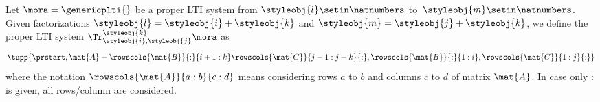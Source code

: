 %

\begin{definition}\label{def:trace-lti-prop}
    Let $\mora = \genericplti{}$ be a proper LTI system from $\styleobj{l}\setin \natnumbers$ to~$\styleobj{m}\setin \natnumbers$.
    Given factorizations $\styleobj{l} = \styleobj{i} + \styleobj{k}$ and $\styleobj{m} = \styleobj{j} + \styleobj{k}$, we define the proper LTI system $\Tr_{\styleobj{i},\styleobj{j}}^{\styleobj{k}}\mora$ as
    \begin{equation}
        \tupp{\prstart,\mat{A} + \rowscols{\mat{B}}{:}{i+1:k}\rowscols{\mat{C}}{j+1:j+k}{:},\rowscols{\mat{B}}{:}{1:i},\rowscols{\mat{C}}{1:j}{:}}
    \end{equation}
    where the notation $\rowscols{\mat{A}}{a:b}{c:d}$ means considering rows $a$ to $b$ and columns $c$ to $d$ of matrix $\mat{A}$.
    In case only $:$ is given, all rows/column are considered.

    \begin{comment}
    where $\mat{B}_\styleobj{i}$ and $\mat{B}_\styleobj{k}$ are such that
    \begin{equation}
        \mat{B} = \begin{bmatrix}
            \mat{B}_\styleobj{i} & \mat{B}_\styleobj{k}
        \end{bmatrix}
    \end{equation}
    and $\mat{C}_\styleobj{j}$ and $\mat{C}_\styleobj{k}$ are such that
    \begin{equation}
        \mat{C} = \begin{bmatrix}
            \mat{C}_\styleobj{j} \\ \mat{C}_\styleobj{k} \\
        \end{bmatrix}.
    \end{equation}
    \end{comment}
\end{definition}

